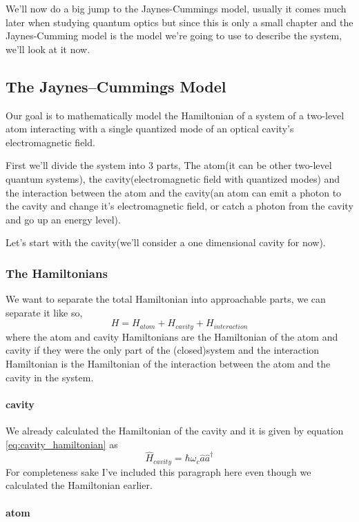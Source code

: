 \documentclass[english, a4paper, 12pt, twoside]{article}
\numberwithin{equation}{section} %
\begin{document}
We'll now do a big jump to the Jaynes-Cummings model, usually it comes much later when studying quantum optics but since this is only a small chapter and the Jaynes-Cumming model is the model we're going to use to describe the system, we'll look at it now.
\subsection{The Jaynes–Cummings Model}
Our goal is to mathematically model the Hamiltonian of a system of a two-level atom interacting with a single quantized mode of an optical cavity's electromagnetic field. %
\par
First we'll divide the system into 3 parts, The atom(it can be other two-level quantum systems), the cavity(electromagnetic field with quantized modes) and the interaction between the atom and the cavity(an atom can emit a photon to the cavity and change it's electromagnetic field, or catch a photon from the cavity and go up an energy level).\par  %

Let's start with the cavity(we'll consider a one dimensional cavity for now).
\subsubsection{The Hamiltonians}
We want to separate the total Hamiltonian into approachable parts, we can separate it like so,
\[
    H = H_{atom} + H_{cavity} + H_{interaction}
\]
where the atom and cavity Hamiltonians are the Hamiltonian of the atom and cavity if they were the only part of the (closed)system and the interaction Hamiltonian is the Hamiltonian of the interaction between the atom and the cavity in the system.

\paragraph*{cavity}
We already calculated the Hamiltonian of the cavity and it is given by equation \ref{eq:cavity_hamiltonian} as
\begin{equation}
    \boxed{\hat{H}_{cavity} = \hbar\omega_c\hat{a}\hat{a}^\dag}
\end{equation}
For completeness sake I've included this paragraph here even though we calculated the Hamiltonian earlier.

\paragraph*{atom}
\end{document}
